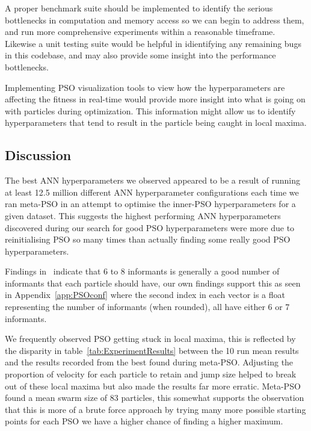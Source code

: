 \documentclass[12pt]{article}
\begin{document}
A proper benchmark suite should be implemented to identify the serious bottlenecks in computation and memory access so we can begin to address them, and run more comprehensive experiments within a reasonable timeframe.
Likewise a unit testing suite would be helpful in idientifying any remaining bugs in this codebase, and may also provide some insight into the performance bottlenecks.

Implementing PSO visualization tools to view how the hyperparameters are affecting the fitness in real-time would provide more insight into what is going on with particles during optimization. 
This information might allow us to identify hyperparameters that tend to result in the particle being caught in local maxima.

\subsection{Discussion}

The best ANN hyperparameters we observed appeared to be a result of running at least 12.5 million different ANN hyperparameter configurations each time we ran meta-PSO in an attempt to optimise the inner-PSO hyperparameters for a given dataset. 
This suggests the highest performing ANN hyperparameters discovered during our search for good PSO hyperparameters were more due to reinitialising PSO so many times than actually finding some really good PSO hyperparameters.


Findings in~\autocite{garcia-nietoWhySixInformants2012,garcia-nietoEmpiricalComputationQuasioptimal2011} indicate that 6 to 8 informants is generally a good number of informants that each particle should have, our own findings support this as seen in Appendix~\ref{app:PSOconf} where the second index in each vector is a float representing the number of informants (when rounded), all have either 6 or 7 informants.


We frequently observed PSO getting stuck in local maxima, this is reflected by the disparity in table~\ref{tab:ExperimentResults} between the 10 run mean results and the results recorded from the best found during meta-PSO. 
Adjusting the proportion of velocity for each particle to retain and jump size helped to break out of these local maxima but also made the results far more erratic.
Meta-PSO found a mean swarm size of 83 particles, this somewhat supports the observation that this is more of a brute force approach by trying many more possible starting points for each PSO we have a higher chance of finding a higher maximum.
\end{document}
